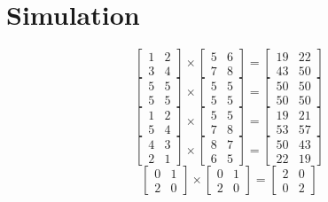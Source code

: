 \documentclass[12pt]{report}
\begin{document}
\section{Simulation}
$$
\begin{bmatrix} 
1 & 2 \\
3 & 4 
\end{bmatrix}
\times
\begin{bmatrix} 
5 & 6 \\
7 & 8 
\end{bmatrix}
=
\begin{bmatrix} 
19 & 22 \\
43 & 50 
\end{bmatrix}
$$
$$
\begin{bmatrix} 
5 & 5 \\
5 & 5 
\end{bmatrix}
\times
\begin{bmatrix} 
5 & 5 \\
5 & 5 
\end{bmatrix}
=
\begin{bmatrix} 
50 & 50 \\
50 & 50
\end{bmatrix}
$$
$$
\begin{bmatrix} 
1 & 2 \\
5 & 4 
\end{bmatrix}
\times
\begin{bmatrix} 
5 & 5 \\
7 & 8 
\end{bmatrix}
=
\begin{bmatrix} 
19 & 21 \\
53 & 57
\end{bmatrix}
$$
$$
\begin{bmatrix} 
4 & 3 \\
2 & 1 
\end{bmatrix}
\times
\begin{bmatrix} 
8 & 7 \\
6 & 5 
\end{bmatrix}
=
\begin{bmatrix} 
50 & 43 \\
22 & 19
\end{bmatrix}
$$
$$
\begin{bmatrix} 
0 & 1 \\
2 & 0 
\end{bmatrix}
\times
\begin{bmatrix} 
0 & 1 \\
2 & 0 
\end{bmatrix}
=
\begin{bmatrix} 
2 & 0 \\
0 & 2
\end{bmatrix}
$$
\end{document}
